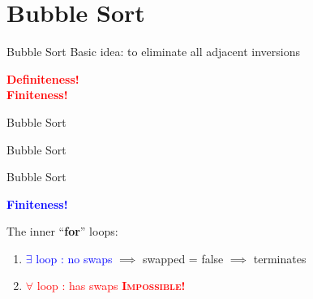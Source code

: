 \section{Bubble Sort}

\begin{frame}{Bubble Sort}
  Basic idea: to eliminate all adjacent inversions

  

  \pause

  \begin{center}
	\textcolor{red}{\bf Definiteness!}\\[0.30cm]
	\pause
	\textcolor{red}{\bf Finiteness!}
  \end{center}
\end{frame}
\begin{frame}{Bubble Sort}
  

\end{frame}
\begin{frame}{Bubble Sort}
  \begin{center}
  \end{center}

\end{frame}
\begin{frame}{Bubble Sort}
  \begin{center}
  \end{center}

  \begin{center}
	\textcolor{blue}{\bf Finiteness!}
  \end{center}

  \pause

  The inner ``{\bf for}'' loops:
  \begin{enumerate}[1)]
	\item \textcolor{blue}{$\exists$ loop : no swaps} $\implies$ swapped = false $\implies$ terminates
	  \pause
	\item \textcolor{red}{$\forall$ loop : has swaps} \pause \qquad \textcolor{red}{\bf \textsc{Impossible}!}
  \end{enumerate}
\end{frame}
